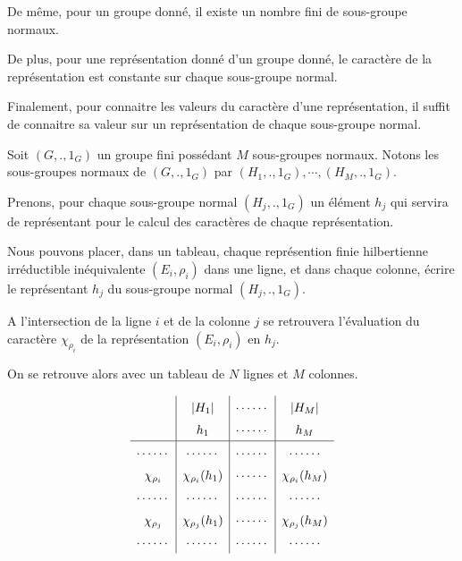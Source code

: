 De même, pour un groupe donné, il existe un nombre fini de sous-groupe normaux.

De plus, pour une représentation donné d'un groupe donné, le caractère de la
représentation est constante sur chaque sous-groupe normal.

Finalement, pour connaitre les valeurs du caractère d'une représentation, il
suffit de connaitre sa valeur sur un représentation de chaque sous-groupe
normal.

Soit $(G, ., 1_{G})$ un groupe fini possédant $M$ sous-groupes normaux. Notons
les sous-groupes normaux de $(G, ., 1_{G})$ par $(H_{1}, ., 1_{G}), \cdots,
(H_{M}, ., 1_{G})$.

Prenons, pour chaque sous-groupe normal $(H_{j}, ., 1_{G})$ un élément $h_{j}$
qui servira de représentant pour le calcul des caractères de chaque
représentation.

Nous pouvons placer, dans un tableau, chaque représention finie hilbertienne
irréductible inéquivalente $(E_{i}, \rho_{i})$ dans une ligne, et dans chaque colonne, écrire le
représentant $h_{j}$ du sous-groupe normal $(H_{j}, ., 1_{G})$.

A l'intersection de la ligne $i$ et de la colonne $j$ se retrouvera l'évaluation
du caractère $\chi_{\rho_{i}}$ de la représentation $(E_{i},
\rho_{i})$ en $h_{j}$.

On se retrouve alors avec un tableau de $N$ lignes et $M$ colonnes.

\[\setlength\tabcolsep{2pt}\def\arraystretch{1.5}
\begin{array}{c|c|c|c}
	& \ordergroup{H_{1}} & \cdots \cdots & \ordergroup{H_{M}} \\
	& h_{1} & \cdots \cdots & h_{M} \\
	\hline
	\cdots \cdots & \cdots \cdots & \cdots \cdots & \cdots \cdots \\
	\chi_{\rho_{i}} & \chi_{\rho_{i}}(h_{1}) & \cdots \cdots & \chi_{\rho_{i}}(h_{M})
	\\
	\cdots \cdots & \cdots \cdots & \cdots \cdots & \cdots \cdots \\
	\chi_{\rho_{j}} & \chi_{\rho_{j}}(h_{1}) & \cdots \cdots & \chi_{\rho_{j}}(h_{M})
	\\
	\cdots \cdots & \cdots \cdots & \cdots \cdots & \cdots \cdots \\
\end{array}
\]

